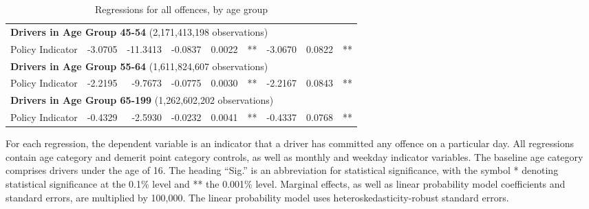 \begin{table}
\begin{tabular}{l r r r r l r r l}
\hline 

\multicolumn{8}{l}{\textbf{Drivers in Age Group 45-54} (2,171,413,198 observations)} \\ 

Policy Indicator        &  -3.0705        &  -11.3413       &  -0.0837        &  0.0022       &   **       &  -3.0670        &  0.0822       &   **       \\ 

\hline 

\multicolumn{8}{l}{\textbf{Drivers in Age Group 55-64} (1,611,824,607 observations)} \\ 

Policy Indicator        &  -2.2195        &  -9.7673       &  -0.0775        &  0.0030       &   **       &  -2.2167        &  0.0843       &   **       \\ 

\hline 

\multicolumn{8}{l}{\textbf{Drivers in Age Group 65-199} (1,262,602,202 observations)} \\ 

Policy Indicator        &  -0.4329        &  -2.5930       &  -0.0232        &  0.0041       &   **       &  -0.4337        &  0.0768       &   **       \\ 

\hline 

\end{tabular} 
\caption{Regressions for all offences, by age group} 
For each regression, the dependent variable is an indicator that a driver has committed  
any offence on a particular day.  
All regressions contain age category and demerit point category controls, 
as well as monthly and weekday indicator variables. 
The baseline age category comprises drivers under the age of 16. 
The heading ``Sig.'' is an abbreviation for statistical significance, with 
the symbol * denoting statistical significance at the 0.1\% level 
and ** the 0.001\% level. 
Marginal effects, as well as linear probability model coefficients and standard errors, are  
multiplied by 100,000.  
The linear probability model uses heteroskedasticity-robust standard errors. 
\label{tab:seas_Logit_vs_LPMx100K_regs_by_age} 
\end{table} 
 
